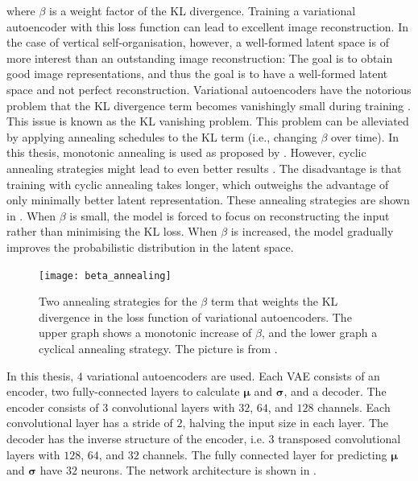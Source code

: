 where $\beta$ is a weight factor of the KL divergence. Training a variational autoencoder with this loss function can lead to excellent image reconstruction.
In the case of vertical self-organisation, however, a well-formed latent space is of more interest than an outstanding image reconstruction: The goal is to obtain good image representations, and thus the goal is to have a well-formed latent space and not perfect reconstruction.
Variational autoencoders have the notorious problem that the KL divergence term becomes vanishingly small during training . This issue is known as the KL vanishing problem.
This problem can be alleviated by applying annealing schedules to the KL term (i.e., changing $\beta$ over time).
In this thesis, monotonic annealing is used as proposed by .
However, cyclic annealing strategies might lead to even better results .
The disadvantage is that training with cyclic annealing takes longer, which outweighs the advantage of only minimally better latent representation.
These annealing strategies are shown in . When $\beta$ is small, the model is forced to focus on reconstructing the input rather than minimising the KL loss.
When $\beta$ is increased, the model gradually improves the probabilistic distribution in the latent space.

\begin{figure}[h]
    \centering
    \texttt{[image: beta\_annealing]}
    \caption[Annealing strategy of the KL weight term of variational autoencoders]{Two annealing strategies for the $\beta$ term that weights the KL divergence in the loss function of variational autoencoders. The upper graph shows a monotonic increase of $\beta$, and the lower graph a cyclical annealing strategy. The picture is from \cite{Fu_Li_Liu_Gao_Celikyilmaz_Carin_2019}.}
\end{figure}

In this thesis, $4$ variational autoencoders are used. Each VAE consists of an encoder, two fully-connected layers to calculate $\boldsymbol{\mu}$ and $\boldsymbol{\sigma}$, and a decoder.
The encoder consists of $3$  convolutional layers with $32$, $64$, and $128$ channels. Each convolutional layer has a stride of $2$, halving the input size in each layer.
The decoder has the inverse structure of the encoder, i.e. $3$ transposed convolutional layers with $128$, $64$, and $32$ channels.
The fully connected layer for predicting $\boldsymbol{\mu}$ and $\boldsymbol{\sigma}$ have $32$ neurons.
The network architecture is shown in .

